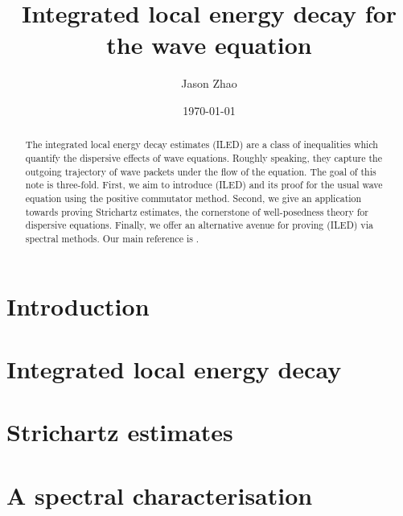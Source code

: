 \documentclass[reqno]{amsart}
\title
{
	Integrated local energy decay for the wave equation
}
\author{Jason Zhao}
\date{\today}
\theoremstyle{remark}
\begin{document}
\maketitle

\begin{abstract}
	The integrated local energy decay estimates (ILED) are a class of inequalities which quantify the dispersive effects of wave equations. Roughly speaking, they capture the outgoing trajectory of wave packets under the flow of the equation. The goal of this note is three-fold. First, we aim to introduce (ILED) and its proof for the usual wave equation using the positive commutator method. Second, we give an application towards proving Strichartz estimates, the cornerstone of well-posedness theory for dispersive equations. Finally, we offer an alternative avenue for proving (ILED) via spectral methods. Our main reference is \cite{MetcalfeEtAl2020a}. 
\end{abstract}

\tableofcontents

\section{Introduction}


\section{Integrated local energy decay}\label{sec:iled}


\section{Strichartz estimates}\label{sec:strichartz}


\section{A spectral characterisation}\label{sec:spectral}





\end{document}
